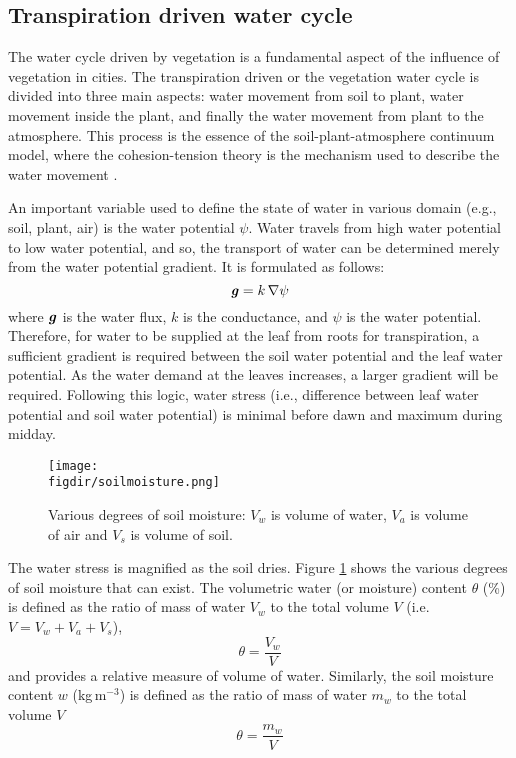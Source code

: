\subsection{Transpiration driven water cycle}

The water cycle driven by vegetation is a fundamental aspect of the influence of vegetation in cities. The transpiration driven or the vegetation water cycle is divided into three main aspects: water movement from soil to plant, water movement inside the plant, and finally the water movement from plant to the atmosphere. This process is the essence of the soil-plant-atmosphere continuum model, where the cohesion-tension theory is the mechanism used to describe the water movement \citep{Dixon1895}. 

An important variable used to define the state of water in various domain (e.g., soil, plant, air) is the water potential $\psi$. Water travels from high water potential to low water potential, and so, the transport of water can be determined merely from the water potential gradient. It is formulated as follows:
\begin{equation}
\textbf{\textit{g}} = k\,\nabla \psi
\end{equation}
where $\textbf{\textit{g}}$ is the water flux, $k$ is the conductance, and $\psi$ is the water potential. Therefore, for water to be supplied at the leaf from roots for transpiration, a sufficient gradient is required between the soil water potential and the leaf water potential. As the water demand at the leaves increases, a larger gradient will be required. Following this logic, water stress (i.e., difference between leaf water potential and soil water potential) is minimal before dawn and maximum during midday. 

\begin{figure}[t]
	\centering
	\texttt{[image: \\figdir/soilmoisture.png]}
	\caption{Various degrees of soil moisture: $V_w$ is volume of water, $V_a$ is volume of air and $V_s$ is volume of soil.}
	\label{fig:soilmoisture}
\end{figure}

The water stress is magnified as the soil dries. Figure \ref{fig:soilmoisture} shows the various degrees of soil moisture that can exist. The volumetric water (or moisture) content $\theta$ (\%) is defined as the ratio of mass of water $V_w$ to the total volume $V$ (i.e. $V=V_w+V_a+V_s$),
\begin{equation}
\theta = \frac{V_w}{V}
\end{equation}
and provides a relative measure of volume of water. Similarly, the soil moisture content $w$ (kg\,m$^{-3}$) is defined as the ratio of mass of water $m_w$ to the total volume $V$
\begin{equation}
\theta = \frac{m_w}{V}
\end{equation}

